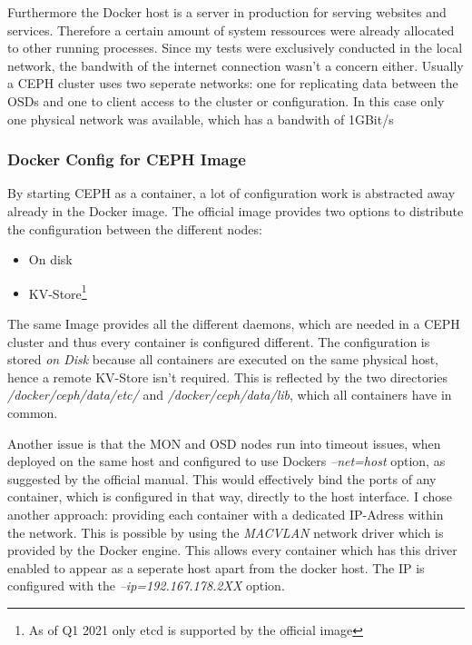 \documentclass[titlepage, a4paper, 11pt]{scrartcl}
\begin{document}
                Furthermore the Docker host is a server in production for serving websites and services. 
                Therefore a certain amount of system ressources were already allocated to other running processes.
                Since my tests were exclusively conducted in the local network, the bandwith of the internet connection wasn't a concern either.
                Usually a CEPH cluster uses two seperate networks: one for replicating data between the OSDs and one to client access to the cluster or configuration.
                In this case only one physical network was available, which has a bandwith of 1GBit/s

            \subsubsection{Docker Config for CEPH Image}\label{config:docker}

                By starting CEPH as a container, a lot of configuration work is abstracted away already in the Docker image.
                The official image \cite{DockerHub} provides two options to distribute the configuration between the different nodes:

                \begin{itemize}
                    \item On disk
                    \item KV-Store\footnote{As of Q1 2021 only etcd is supported by the official image}
                \end{itemize}

                The same Image provides all the different daemons, which are needed in a CEPH cluster and thus every container is configured different.
                The configuration is stored \textit{on Disk} because all containers are executed on the same physical host, hence a remote KV-Store isn't required.
                This is reflected by the two directories \textit{/docker/ceph/data/etc/} and \textit{/docker/ceph/data/lib}, which all containers have in common.
                
                Another issue is that the MON and OSD nodes run into timeout issues, when deployed on the same host and configured to use Dockers \textit{--net=host} option, as suggested by the official manual. This would effectively bind the ports of any container, which is configured in that way, directly to the host interface. 
                I chose another approach: providing each container with a dedicated IP-Adress within the network. This is possible by using the \textit{MACVLAN} network
                driver which is provided by the Docker engine. This allows every container which has this driver enabled to appear as a seperate host apart from the docker host. The IP is configured with the \textit{--ip=192.167.178.2XX} option.
\end{document}
